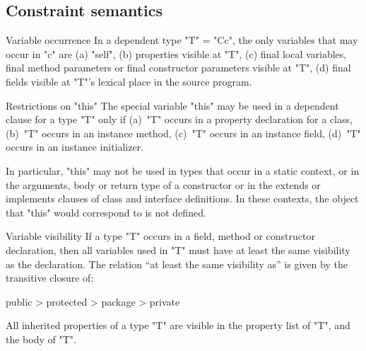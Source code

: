 \fi





\subsection{Constraint semantics}

\begin{staticrule}{Variable occurrence}
In a dependent type \xcd"T" = \xcd"C{c}", the only variables that may
occur in \xcd"c" are (a)
\xcd"self", (b) properties visible at \xcd"T", (c) final local variables, final
method parameters or final constructor parameters visible at \xcd"T", (d)
final fields visible at \xcd"T"'s lexical place in the source program.  
\end{staticrule}

\begin{staticrule}{Restrictions on \xcd"this"}
  The special variable \xcd"this" may be used in a dependent clause for a type \xcd"T"
  only if (a)~\xcd"T" occurs in a property declaration for a
  class, (b)~\xcd"T"
  occurs in an instance method, (c)~\xcd"T" occurs in an
  instance field, (d)~\xcd"T"
  occurs in an instance initializer.

  In particular, \xcd"this" may not be used in types that occur in a static
  context, or in the arguments, body or return type of a constructor or
  in the extends or implements clauses of class and interface
  definitions.  In these contexts, the object that \xcd"this" would
  correspond to is not defined.
\end{staticrule}

\begin{staticrule}{Variable visibility}
  If a type \xcd"T" occurs in a field, method or constructor
  declaration, then all variables used in \xcd"T" must have at least the
  same visibility as the declaration.  The relation ``at least the same
  visibility as'' is given by the transitive closure of:

\begin{xten}
public > protected > package > private
\end{xten}

All inherited properties of a type \xcd"T" are visible in the property
list of \xcd"T", and the body of \xcd"T".

\end{staticrule}

